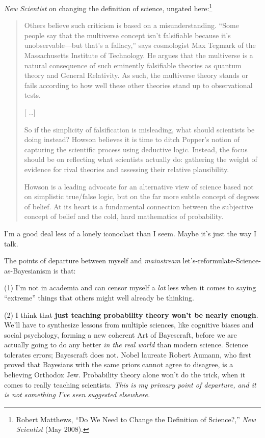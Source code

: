 \myendsectiontext


{
 \textit{New Scientist} on changing the definition of science,
ungated here:\footnote{Robert Matthews, ``Do We Need to Change the
Definition of Science?,'' \textit{New Scientist} (May
2008).}}

\begin{quotation}
{
 Others believe such criticism is based on a misunderstanding.
``Some people say that the multiverse concept
isn't falsifiable because it's
unobservable---but that's a
fallacy,'' says cosmologist Max Tegmark of the
Massachusetts Institute of Technology. He argues that the multiverse is
a natural consequence of such eminently falsifiable theories as quantum
theory and General Relativity. As such, the multiverse theory stands or
fails according to how well these other theories stand up to
observational tests.}

{
 [ \ldots ]}

{
 So if the simplicity of falsification is misleading, what should
scientists be doing instead? Howson believes it is time to ditch
Popper's notion of capturing the scientific process
using deductive logic. Instead, the focus should be on reflecting what
scientists actually do: gathering the weight of evidence for rival
theories and assessing their relative plausibility.}

{
 Howson is a leading advocate for an alternative view of science
based not on simplistic true/false logic, but on the far more subtle
concept of degrees of belief. At its heart is a fundamental connection
between the subjective concept of belief and the cold, hard mathematics
of probability.}
\end{quotation}

{
 I'm a good deal less of a lonely iconoclast than I
seem. Maybe it's just the way I talk.}

{
 The points of departure between myself and \textit{mainstream}
let's-reformulate-Science-as-Bayesianism is that:}

{
 (1) I'm not in academia and can censor myself a
\textit{lot} less when it comes to saying
``extreme'' things that others might
well already be thinking.}

{
 (2) I think that \textbf{just teaching probability theory
won't be nearly enough}. We'll have to
synthesize lessons from multiple sciences, like cognitive biases and
social psychology, forming a new coherent Art of Bayescraft, before we
are actually going to do any better \textit{in the real world} than
modern science. Science tolerates errors; Bayescraft does not. Nobel
laureate Robert Aumann, who first proved that Bayesians with the same
priors cannot agree to disagree, is a believing Orthodox Jew.
Probability theory alone won't do the trick, when it
comes to really teaching scientists. \textit{This is my primary point
of departure, and it is not something I've seen
suggested elsewhere.}}

